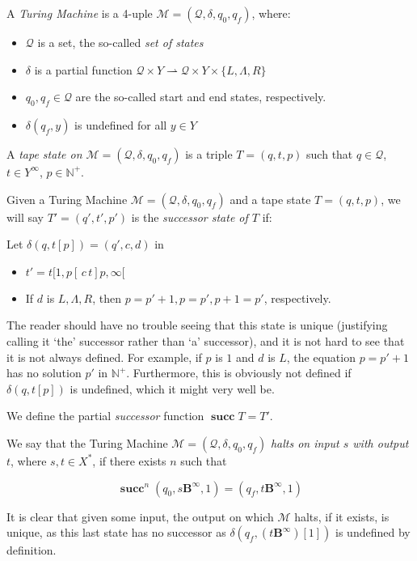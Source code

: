 \documentclass{article}
\newcommand{\B}{\mathbf{B}}
\newcommand{\N}{\mathbb{N}}
\newcommand{\M}{\mathcal{M}}
\newcommand{\Q}{\mathcal{Q}}
\DeclareMathOperator{\suc}{\mathbf{succ}}
\begin{document}
	A \emph{Turing Machine} is a 4-uple $\M = (\Q, \delta, q_0, q_f)$, where:
	
	\begin{itemize}
	\item $\Q$ is a set, the so-called \emph{set of states}
	
	\item $\delta$ is a partial function $\Q \times Y \rightharpoonup \Q \times Y \times \{L, \Lambda, R\}$
	
	\item $q_0, q_f \in \Q$ are the so-called start and end states, respectively.
	
	\item $\delta(q_f, y)$ is undefined for all $y \in Y$
	\end{itemize}
	
	A \emph{tape state on $\M = (\Q, \delta, q_0, q_f)$} is a triple $T = (q, t, p)$ such that $q \in \Q$, $t \in Y^\infty$, $p \in \N^+$.
	
	Given a Turing Machine $\M = (\Q, \delta, q_0, q_f)$ and a tape state $T = (q, t, p)$, we will say $T' = (q', t', p')$ is the \emph{successor state of $T$} if:
	
	Let $\delta(q, t[p]) = (q', c, d)$ in
	
	\begin{itemize}
	\item $t' = t[1, p[ \, c \, t]p, \infty[$
	
	\item If $d$ is $L, \Lambda, R$, then $p = p' + 1, p = p', p + 1 = p'$, respectively.
	\end{itemize}
	
	The reader should have no trouble seeing that this state is unique (justifying calling it `the' successor rather than `a' successor), and it is not hard to see that it is not always defined. For example, if $p$ is $1$ and $d$ is $L$, the equation $p = p' + 1$ has no solution $p'$ in $\N^+$. Furthermore, this is obviously not defined if $\delta(q, t[p])$ is undefined, which it might very well be.
	
	We define the partial \emph{successor} function $\suc T = T'$.
	
	We say that the Turing Machine $\M = (\Q, \delta, q_0, q_f)$ \emph{halts on input $s$ with output $t$}, where $s, t \in X^*$, if there exists $n$ such that
	
	\[\suc^n (q_0, s \B^\infty, 1) = (q_f, t \B^\infty, 1)\]
	
	It is clear that given some input, the output on which $\M$ halts, if it exists, is unique, as this last state has no successor as $\delta(q_f, (t \B^\infty)[1])$ is undefined by definition.
	
\end{document}
